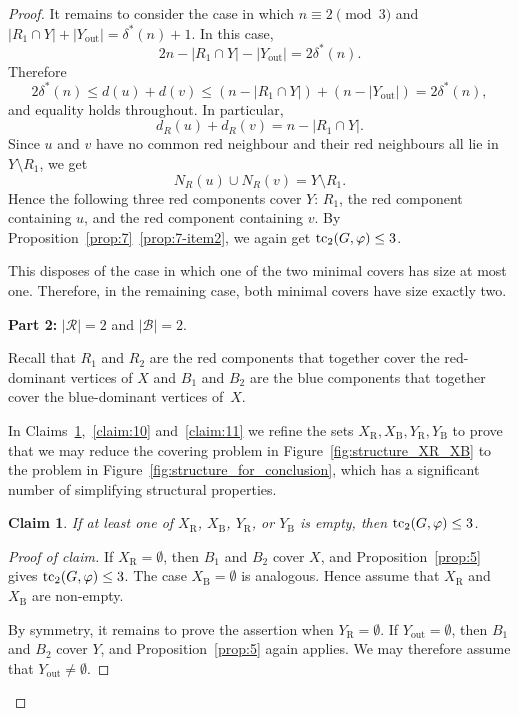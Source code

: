 \documentclass[12pt,reqno,a4paper]{amsart}
\newtheorem{claim}[theorem] {Claim}
\newenvironment{claimproof}[1][Proof of claim]{\begin{proof}[#1]\renewcommand{\qedsymbol}{$\scriptstyle\square$}}{\end{proof}}
\def\tc{\mathop{\text{\rm tc}}\nolimits}
\newcommand{\out}{\mathrm{out}}
\newcommand{\R}{\mathrm{R}}
\newcommand{\B}{\mathrm{B}}
\begin{document}
\begin{proof}
It remains to consider the case in which $n\equiv 2\pmod 3$ and
$|R_1\cap Y|+|Y_{\out}|=\delta^*(n)+1$. In this case,
\[
    2n-|R_1\cap Y|-|Y_{\out}|=2\delta^*(n).
\]
Therefore
\[
    2\delta^*(n)
    \le d(u)+d(v)
    \le (n-|R_1\cap Y|)+(n-|Y_{\out}|)
    =2\delta^*(n),
\]
and equality holds throughout. In particular,
\[
    d_R(u)+d_R(v)=n-|R_1\cap Y|.
\]
Since $u$ and $v$ have no common red neighbour and their red neighbours all lie
in $Y\setminus R_1$, we get
\[
    N_R(u)\cup N_R(v)=Y\setminus R_1.
\]
Hence the following three red components cover $Y$: $R_1$, the red component containing $u$, and the
red component containing $v$. By
Proposition~\ref{prop:7}~\ref{prop:7-item2}, we again get $\tc_2(G,\varphi)\le 3$.

This disposes of the case in which one of the two minimal covers has size at
most one. Therefore, in the remaining case, both minimal covers have size
exactly two.


\medskip
\noindent\textbf{Part 2:} $|\mathcal R|=2$ and $|\mathcal B|=2$.
\par\smallskip


Recall that $R_1$ and $R_2$ are the red components that
together cover the red-dominant vertices of $X$ and $B_1$ and $B_2$ are the
blue components that together cover the blue-dominant vertices of~$X$.

In Claims~\ref{claim:9},~\ref{claim:10} and~\ref{claim:11} we refine the sets $X_{\R}, X_{\B}, Y_{\R}, Y_{\B}$ to prove that we may reduce the covering problem in Figure~\ref{fig:structure_XR_XB} to the problem in
Figure~\ref{fig:structure_for_conclusion}, which has a significant number of
simplifying structural properties.

\begin{claim}\label{claim:9}
If at least one of $X_{\R}$, $X_{\B}$, $Y_{\R}$, or $Y_{\B}$ is empty, then
$\tc_2(G,\varphi)\le3$.
\end{claim}
\begin{claimproof}
If $X_{\R}=\emptyset$, then $B_1$ and $B_2$ cover $X$, and
Proposition~\ref{prop:5} gives $\tc_2(G,\varphi)\le3$. The case $X_{\B}=\emptyset$ is
analogous. Hence assume that $X_{\R}$ and $X_{\B}$ are non-empty.

By symmetry, it remains to prove the assertion when $Y_{\R}=\emptyset$. If
$Y_{\out}=\emptyset$, then $B_1$ and $B_2$ cover $Y$, and
Proposition~\ref{prop:5} again applies. We may therefore assume that
$Y_{\out}\neq\emptyset$.


\end{claimproof}
\end{proof}
\end{document}
